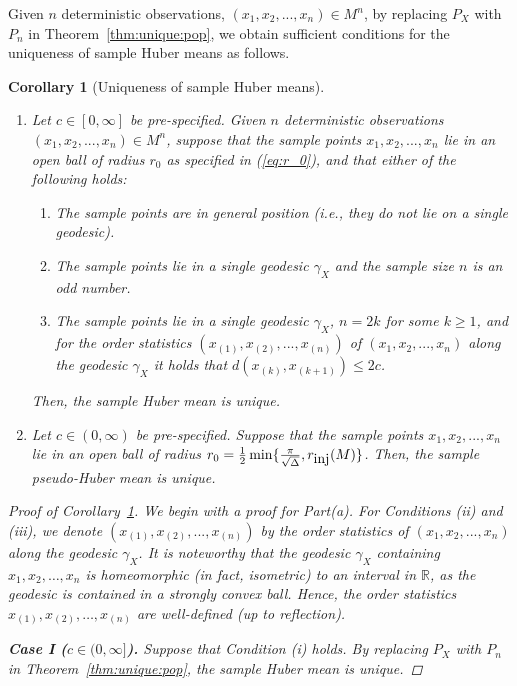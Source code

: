 \documentclass[preprint]{imsart}
\theoremstyle{plain}
\newtheorem{corollary}{Corollary}
\theoremstyle{remark}
\begin{document}
\begin{appendix}
Given $n$ deterministic observations, $(x_{1}, x_{2}, ..., x_{n}) \in M^{n}$, by replacing $P_{X}$ with $P_{n}$ in Theorem~\ref{thm:unique:pop}, we obtain sufficient conditions for the uniqueness of sample Huber means as follows. 
\begin{corollary}[Uniqueness of sample Huber means]\label{cor:unique:sam}
\begin{enumerate}
\item[(a)]
Let $c \in [0,\infty]$ be pre-specified. Given $n$ deterministic observations $(x_{1}, x_{2}, ..., x_{n}) \in M^{n}$, suppose that the sample points $x_{1}, x_{2}, ..., x_{n}$ lie in an open ball of radius $r_0$ as specified in (\ref{eq:r_0}), and that either of the following holds: 
\begin{enumerate}
 \item[(i)] The sample points are in general position (i.e., they do not lie on a single geodesic).
  \item[(ii)] The sample points lie in a single geodesic $\gamma_X$ and the sample size $n$ is an odd number. 
  \item[(iii)] The sample points lie in a single geodesic $\gamma_X$, $n = 2k$ for some $k \ge 1$, and for the order statistics $(x_{(1)}, x_{(2)}, ..., x_{(n)})$ of $(x_{1}, x_{2}, ..., x_{n})$ along the geodesic $\gamma_{X}$ it holds that $d(x_{(k)}, x_{(k+1)})\le 2c$. 
\end{enumerate} 
Then, the sample Huber mean is unique. 
\item[(b)]
Let $c \in (0, \infty)$ be pre-specified. Suppose that the sample points $x_{1}, x_{2}, ..., x_{n}$ lie in an open ball of radius $r_0 = \frac{1}{2}\min\{\frac{\pi}{\sqrt{\Delta}}, r_{\mbox{\tiny inj}}(M) \}$. Then, the sample pseudo-Huber mean is unique.
\end{enumerate}

\begin{proof}[Proof of Corollary~\ref{cor:unique:sam}]
We begin with a proof for Part(a). For Conditions (ii) and (iii), we denote $(x_{(1)}, x_{(2)}, ..., x_{(n)})$ by the order statistics of $(x_{1}, x_{2}, ..., x_{n})$ along the geodesic $\gamma_{X}$. It is noteworthy that the geodesic $\gamma_{X}$ containing $x_1, x_2, \ldots, x_n$ is homeomorphic (in fact, isometric) to an interval in $\mathbb{R}$, as the geodesic is contained in a strongly convex ball. Hence, the order statistics $x_{(1)}, x_{(2)}, \ldots, x_{(n)}$ are well-defined (up to reflection). 

\textbf{Case I ($c \in (0, \infty]$).} Suppose that Condition (i) holds. By replacing $P_{X}$ with $P_{n}$ in Theorem~\ref{thm:unique:pop}, the sample Huber mean is unique.


\end{proof}
\end{corollary}
\end{appendix}
\end{document}
